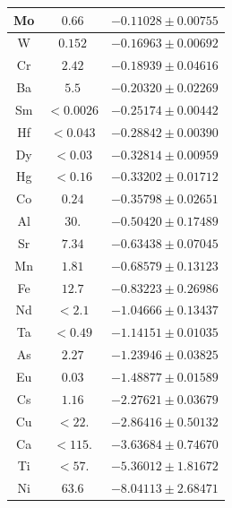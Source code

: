 \documentclass[11pt]{article}
\begin{document}
\begin{table}[ht]
\begin{tabular}{| c | c | c |}
    Mo                &   $0.66$               &   $-0.11028\pm0.00755$ \\ \hline
    W                 &   $0.152$              &   $-0.16963\pm0.00692$ \\ \hline
    Cr                &   $2.42$               &   $-0.18939\pm0.04616$ \\ \hline
    Ba                &   $5.5$                &   $-0.20320\pm0.02269$ \\ \hline
    Sm                & $< 0.0026$             &   $-0.25174\pm0.00442$ \\ \hline
    Hf                & $< 0.043$              &   $-0.28842\pm0.00390$ \\ \hline
    Dy                & $< 0.03$               &   $-0.32814\pm0.00959$ \\ \hline
    Hg                & $< 0.16$               &   $-0.33202\pm0.01712$ \\ \hline
    Co                &   $0.24$               &   $-0.35798\pm0.02651$ \\ \hline
    Al                & $ 30.$                 &   $-0.50420\pm0.17489$ \\ \hline
    Sr                &   $ 7.34$              &   $-0.63438\pm0.07045$ \\ \hline
    Mn                &   $ 1.81$              &   $-0.68579\pm0.13123$ \\ \hline
    Fe                &   $12.7$               &   $-0.83223\pm0.26986$ \\ \hline
    Nd                & $<  2.1$               &   $-1.04666\pm0.13437$ \\ \hline
    Ta                & $<  0.49$              &   $-1.14151\pm0.01035$ \\ \hline
    As                &   $ 2.27$              &   $-1.23946\pm0.03825$ \\ \hline
    Eu                &   $ 0.03$              &   $-1.48877\pm0.01589$ \\ \hline
    Cs                &   $ 1.16$              &   $-2.27621\pm0.03679$ \\ \hline
    Cu                & $< 22.$                &   $-2.86416\pm0.50132$ \\ \hline
    Ca                & $<115.$                &   $-3.63684\pm0.74670$ \\ \hline
    Ti                & $< 57.$                &   $-5.36012\pm1.81672$ \\ \hline
    Ni                &   $63.6$               &   $-8.04113\pm2.68471$ \\ \hline

\end{tabular}
\end{table}
\end{document}
